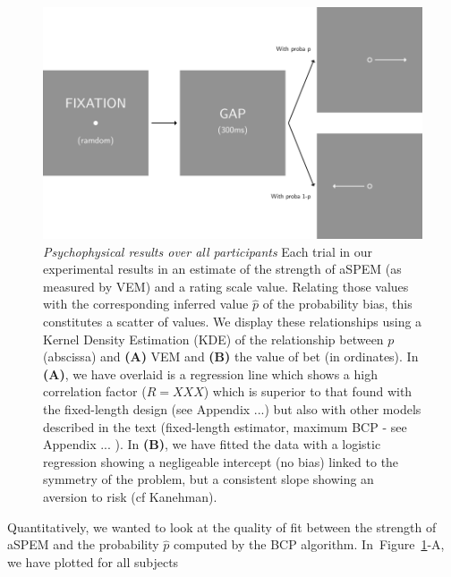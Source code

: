 \documentclass[profile,final,english,draft]{article}%
\newcommand{\seeFig}[1]{Figure~\ref{fig:#1}}
\begin{document}
\begin{figure}%
\begin{center}
\includegraphics[width=\linewidth]{figure4}
\end{center}
\caption{\emph{Psychophysical results over all participants}
Each trial in our experimental results in an estimate of
the strength of aSPEM (as measured by VEM)
and a rating scale value.
Relating those values with the corresponding inferred value $\hat{p}$
of the probability bias,
this constitutes a scatter of values.
We display these relationships using a
Kernel Density Estimation (KDE) of the relationship between $p$ (abscissa)
and \textbf{(A)} VEM and \textbf{(B)} the value of bet (in ordinates).
In \textbf{(A)}, we have overlaid is a regression line which shows
a high correlation factor ($R=XXX$) which is superior to that found
with the fixed-length design (see Appendix ...)
but also with other models described in the text
(fixed-length estimator, maximum BCP - see Appendix ... ).
In \textbf{(B)}, we have fitted the data with a logistic regression
showing a negligeable intercept (no bias) linked to the symmetry
of the problem, but a consistent slope showing an aversion to risk
(cf Kanehman).
}
\label{fig:results_psycho}
\end{figure}
Quantitatively, we wanted to look at the quality of fit
between the strength of aSPEM and
the probability $\hat{p}$ computed by the BCP algorithm.
In~\seeFig{results_psycho}-A, we have plotted for all subjects
\end{document}
